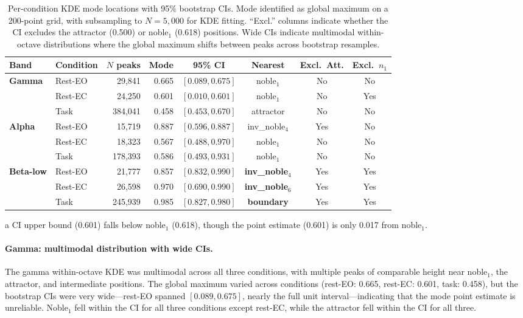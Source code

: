 \documentclass[11pt,a4paper]{article}
\begin{document}
\begin{table}[H]
\centering
\caption{Per-condition KDE mode locations with 95\% bootstrap CIs. Mode identified as global maximum on a 200-point grid, with subsampling to $N = 5{,}000$ for KDE fitting. ``Excl.'' columns indicate whether the CI excludes the attractor (0.500) or noble$_1$ (0.618) positions. Wide CIs indicate multimodal within-octave distributions where the global maximum shifts between peaks across bootstrap resamples.}
\label{tab:modes}
\begin{threeparttable}
\begin{tabular}{@{}llrrcccc@{}}
\toprule
Band & Condition & $N$ peaks & Mode & 95\% CI & Nearest & Excl.\ Att. & Excl.\ $n_1$ \\
\midrule
\textbf{Gamma} & Rest-EO & 29,841 & 0.665 & $[0.089, 0.675]$ & noble$_1$ & No & No \\
               & Rest-EC & 24,250 & 0.601 & $[0.010, 0.601]$ & noble$_1$ & No & Yes\tnote{a} \\
               & Task    & 384,041 & 0.458 & $[0.453, 0.670]$ & attractor & No & No \\
\midrule
\textbf{Alpha} & Rest-EO & 15,719 & 0.887 & $[0.596, 0.887]$ & inv\_noble$_4$ & Yes & No \\
               & Rest-EC & 18,323 & 0.567 & $[0.488, 0.970]$ & noble$_1$ & No & No \\
               & Task    & 178,393 & 0.586 & $[0.493, 0.931]$ & noble$_1$ & No & No \\
\midrule
\textbf{Beta-low} & Rest-EO & 21,777 & 0.857 & $[0.832, 0.990]$ & \textbf{inv\_noble$_4$} & Yes & Yes \\
                   & Rest-EC & 26,598 & 0.970 & $[0.690, 0.990]$ & \textbf{inv\_noble$_6$} & Yes & Yes \\
                   & Task    & 245,939 & 0.985 & $[0.827, 0.980]$ & \textbf{boundary} & Yes & Yes \\
\bottomrule
\end{tabular}
\begin{tablenotes}
\small
\item[a] CI upper bound (0.601) falls below noble$_1$ (0.618), though the point estimate (0.601) is only 0.017 from noble$_1$.
\end{tablenotes}
\end{threeparttable}
\end{table}

\paragraph{Gamma: multimodal distribution with wide CIs.}
The gamma within-octave KDE was multimodal across all three conditions, with multiple peaks of comparable height near noble$_1$, the attractor, and intermediate positions. The global maximum varied across conditions (rest-EO: 0.665, rest-EC: 0.601, task: 0.458), but the bootstrap CIs were very wide---rest-EO spanned $[0.089, 0.675]$, nearly the full unit interval---indicating that the mode point estimate is unreliable. Noble$_1$ fell within the CI for all three conditions except rest-EC, while the attractor fell within the CI for all three.
\end{document}
